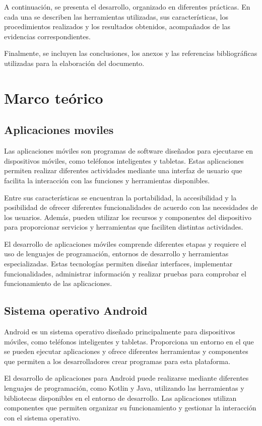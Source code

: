 \documentclass[12pt,a4paper]{article}
\begin{document}
A continuación, se presenta el desarrollo, organizado
en diferentes prácticas. En cada una se describen las
herramientas utilizadas, sus características, los
procedimientos realizados y los resultados obtenidos,
acompañados de las evidencias correspondientes.

Finalmente, se incluyen las conclusiones, los anexos y
las referencias bibliográficas utilizadas para la
elaboración del documento.

\section{Marco teórico}
\subsection{Aplicaciones moviles}
Las aplicaciones móviles son programas de software diseñados
para ejecutarse en dispositivos móviles, como teléfonos
inteligentes y tabletas. Estas aplicaciones permiten realizar
diferentes actividades mediante una interfaz de usuario que
facilita la interacción con las funciones y herramientas
disponibles.

Entre sus características se encuentran la portabilidad,
la accesibilidad y la posibilidad de ofrecer diferentes
funcionalidades de acuerdo con las necesidades de los
usuarios. Además, pueden utilizar los recursos y
componentes del dispositivo para proporcionar servicios
y herramientas que faciliten distintas actividades.

El desarrollo de aplicaciones móviles comprende diferentes
etapas y requiere el uso de lenguajes de programación,
entornos de desarrollo y herramientas especializadas.
Estas tecnologías permiten diseñar interfaces, implementar
funcionalidades, administrar información y realizar pruebas
para comprobar el funcionamiento de las aplicaciones.


\subsection{Sistema operativo Android}
Android es un sistema operativo diseñado principalmente para
dispositivos móviles, como teléfonos inteligentes y tabletas.
Proporciona un entorno en el que se pueden ejecutar
aplicaciones y ofrece diferentes herramientas y componentes
que permiten a los desarrolladores crear programas para
esta plataforma.

El desarrollo de aplicaciones para Android puede realizarse
mediante diferentes lenguajes de programación, como Kotlin
y Java, utilizando las herramientas y bibliotecas disponibles
en el entorno de desarrollo. Las aplicaciones utilizan
componentes que permiten organizar su funcionamiento y
gestionar la interacción con el sistema operativo.
\end{document}
